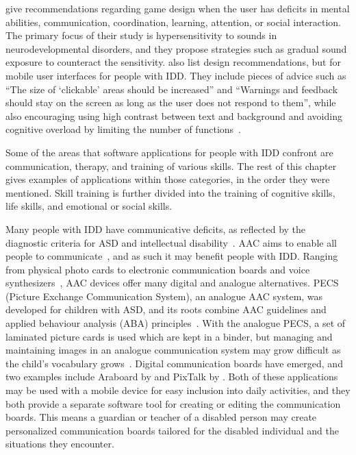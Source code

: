 \documentclass[utf8,english]{gradu3}
\begin{document}
\textcite{line2018} give recommendations regarding game design
when the user has deficits in mental abilities, communication,
coordination, learning, attention, or social interaction.
The primary focus of their study is hypersensitivity to sounds
in neurodevelopmental disorders, and they propose strategies such
as gradual sound exposure to counteract the sensitivity.
\textcite{dekelver2015} also list design recommendations,
but for mobile user interfaces for people with IDD.
They include pieces of advice such as ``The size of `clickable' areas should be increased''
and ``Warnings and feedback should stay on the screen as long as the user does not
respond to them'', while also encouraging using high contrast between
text and background and avoiding cognitive overload by limiting the
number of functions~\parencite[p. 829]{dekelver2015}.

Some of the areas that software applications for people with IDD
confront are communication, therapy, and training of various skills.
The rest of this chapter gives examples of applications within those
categories, in the order they were mentioned.
Skill training is further divided into the training of cognitive skills,
life skills, and emotional or social skills.

Many people with IDD have communicative deficits, as reflected by the diagnostic criteria
for ASD and intellectual disability~\parencite{dsm5}.
AAC aims to enable all people to communicate~\parencite{ascari2018}, and as such it may benefit people with IDD.
Ranging from physical photo cards to electronic communication boards and voice synthesizers~\parencite{ascari2018},
AAC devices offer many digital and analogue alternatives.
PECS (Picture Exchange Communication System), an analogue AAC system,
was developed for children with ASD, and its roots combine AAC guidelines
and applied behaviour analysis (ABA) principles~\parencite{de2011}.
With the analogue PECS, a set of laminated picture cards is used which are kept in a binder, but
managing and maintaining images in an analogue communication system
may grow difficult as the child's vocabulary grows~\parencite{de2011}.
Digital communication boards have emerged,
and two examples include Araboard by \textcite{baldassarri2014}
and PixTalk by \textcite{de2011}.
Both of these applications may be used with a mobile device for easy inclusion into daily activities,
and they both provide a separate software tool for creating or editing the communication boards.
This means a guardian or teacher of a disabled person may create personalized communication boards
tailored for the disabled individual and the situations they encounter.
\end{document}
